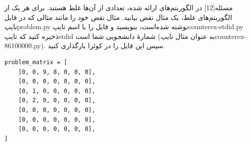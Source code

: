 ‌مسئله[12]
در الگوریتم‌های ارائه شده، تعدادی از آن‌ها غلط هستند. برای هر یک از الگوریتم‌‌های غلط، یک مثال نقض بیابید. مثال نقض خود را مانند مثالی که در فایل 
‌تایپ{problem.py} 
نوشته شده‌است، بنویسید و فایل را با اسم
‌تایپ{counterex-stdid.py}
ذخیره کنید که ‌تایپ{stdid} شمارۀ دانشجویی شما است (به عنوان مثال 
‌تایپ{counterex-86100000.py}). سپس این فایل را در کوئرا بارگذاری کنید. 


	
	\begin{latin}
				\color{answercolor}
		\begin{lstlisting}
problem_matrix = [
	[0, 0, 9, 8, 0, 0, 0],
	[0, 0, 0, 0, 0, 0, 0],
	[0, 1, 0, 0, 0, 0, 0],
	[0, 2, 0, 0, 0, 0, 0],
	[0, 0, 0, 0, 0, 0, 0],
	[0, 0, 0, 0, 0, 0, 0],
	[0, 0, 0, 0, 0, 0, 0],
]
	\end{lstlisting}
	\end{latin}










